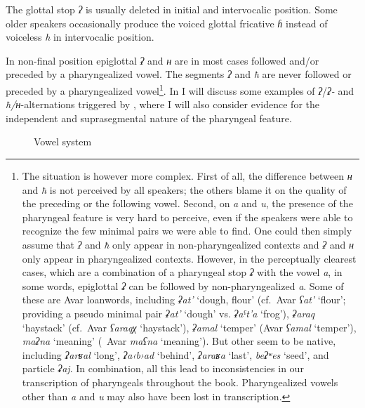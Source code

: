 \documentclass[output=paper]{langsci/langscibook}
\begin{document}
The glottal stop \emph{ʔ} is usually deleted in initial and intervocalic
position. Some older speakers occasionally produce the voiced glottal
fricative \emph{ɦ} instead of voiceless \emph{h} in intervocalic
position.

In non-final position epiglottal \emph{ʡ} and \emph{ʜ} are in most cases
followed and/or preceded by a pharyngealized vowel. The
segments \emph{ʔ} and \emph{ħ} are never followed or preceded by a
pharyngealized vowel\footnote{The situation is however more complex. First of all, the difference between \emph{ʜ} and \emph{ħ} is not perceived by all speakers; the others blame it on the quality of the preceding or the following vowel. Second, on \emph{a} and \emph{u}, the presence of the pharyngeal feature is very hard to perceive, even if the speakers were able to recognize the few minimal pairs we were able to find. One could then simply assume that \emph{ʔ} and \emph{ħ} only appear in non-pharyngealized contexts and \emph{ʡ} and \emph{ʜ} only appear in pharyngealized contexts. However, in the perceptually clearest cases, which are a combination of a pharyngeal stop \emph{ʡ} with the vowel \emph{a}, in some words, epiglottal \emph{ʡ} can be followed by non-pharyngealized \emph{a}. Some of these are Avar loanwords, including \emph{ʡat'} `dough, flour' (cf.~Avar \emph{ʕat'} `flour'; providing a pseudo minimal pair \emph{ʡat'} `dough' vs. \emph{ʡaˤt'a} `frog'), \emph{ʡaraq} `haystack' (cf.~Avar \emph{ʕaraqχ} `haystack'), \emph{ʡamal} `temper' (Avar \emph{ʕamal} `temper'), \emph{maʡna} `meaning' (~Avar \emph{maʕna} `meaning'). But other seem to be native, including \emph{ʡarʁal} `long', \emph{ʡa‹b›ad} `behind', \emph{ʡaraʁa} `last', \emph{beʡʷes} `seed', and particle \emph{ʡaj}. In combination, all this lead to inconsistencies in our transcription of pharyngeals throughout the book. Pharyngealized vowels other than \emph{a} and \emph{u} may also have been lost in transcription.}. In  I will discuss some examples of
\emph{ʔ}/\emph{ʡ-} and \emph{ħ/ʜ}-alternations triggered by ,
where I will also consider evidence for the independent and
suprasegmental nature of the pharyngeal feature.


\begin{wrapfigure}[8]{r}{4cm}
\vspace{-1.2\baselineskip}
  \begin{vowel}[plain]
\end{vowel}
\caption{Vowel system}
\end{wrapfigure}
\end{document}
